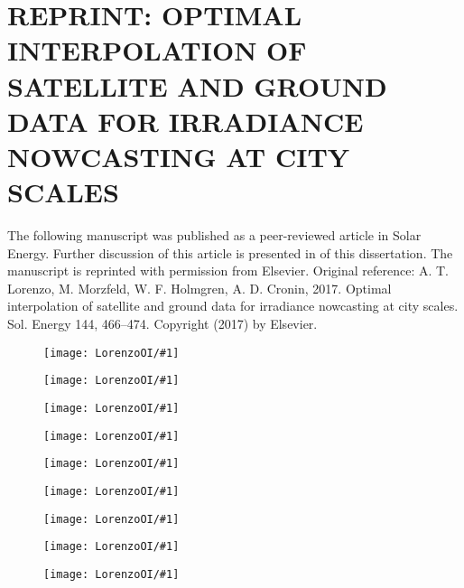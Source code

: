 \chapter{REPRINT: OPTIMAL INTERPOLATION OF SATELLITE AND GROUND DATA
  FOR IRRADIANCE NOWCASTING AT CITY SCALES}
\label{app:satoi}

The following manuscript was published as a peer-reviewed article in
Solar Energy.
Further discussion of this article is presented in 
of this dissertation.
The manuscript is reprinted with permission from Elsevier. Original
reference: A. T. Lorenzo, M. Morzfeld, W. F. Holmgren, A. D. Cronin,
2017. Optimal interpolation of satellite and ground data for
irradiance nowcasting at city scales. Sol. Energy 144, 466--474.
Copyright (2017) by Elsevier.

\newcommand{\figOI}[1]{
\begin{figure}
\texttt{[image: LorenzoOI/\#1]}
\end{figure}
}


\figOI{pg1}
\figOI{pg2}
\figOI{pg3}
\figOI{pg4}
\figOI{pg5}
\figOI{pg6}
\figOI{pg7}
\figOI{pg8}
\figOI{pg9}

